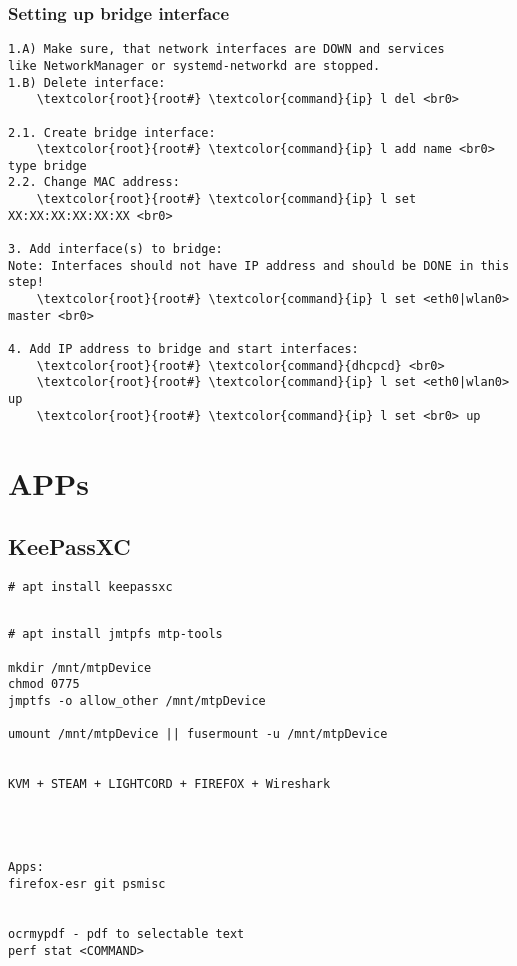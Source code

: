 \documentclass[10pt, a4paper, onecolumn, openany]{book} %
\begin{document}
\subsection{Setting up bridge interface}
\begin{Verbatim}[commandchars=\\\{\}]
1.A) Make sure, that network interfaces are DOWN and services 
like NetworkManager or systemd-networkd are stopped.
1.B) Delete interface:
    \textcolor{root}{root#} \textcolor{command}{ip} l del <br0>

2.1. Create bridge interface:
    \textcolor{root}{root#} \textcolor{command}{ip} l add name <br0> type bridge
2.2. Change MAC address:
    \textcolor{root}{root#} \textcolor{command}{ip} l set XX:XX:XX:XX:XX:XX <br0>

3. Add interface(s) to bridge:
Note: Interfaces should not have IP address and should be DONE in this step!
    \textcolor{root}{root#} \textcolor{command}{ip} l set <eth0|wlan0> master <br0>

4. Add IP address to bridge and start interfaces:
    \textcolor{root}{root#} \textcolor{command}{dhcpcd} <br0>
    \textcolor{root}{root#} \textcolor{command}{ip} l set <eth0|wlan0> up  
    \textcolor{root}{root#} \textcolor{command}{ip} l set <br0> up
\end{Verbatim}



\chapter{APPs}
\section{KeePassXC}
\begin{Verbatim}[commandchars=\\\{\}]
# apt install keepassxc


\end{Verbatim}


\begin{Verbatim}[commandchars=\\\{\}]
# apt install jmtpfs mtp-tools

mkdir /mnt/mtpDevice
chmod 0775
jmptfs -o allow_other /mnt/mtpDevice

umount /mnt/mtpDevice || fusermount -u /mnt/mtpDevice


KVM + STEAM + LIGHTCORD + FIREFOX + Wireshark




Apps:
firefox-esr git psmisc


ocrmypdf - pdf to selectable text
perf stat <COMMAND>
\end{Verbatim}
\end{document}

